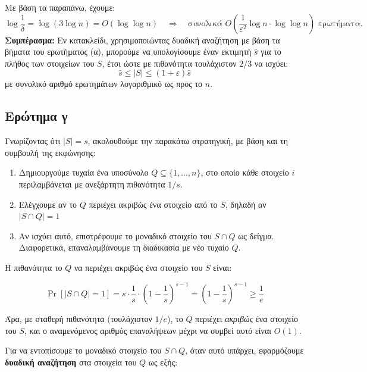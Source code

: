 \documentclass[12pt]{article}
\begin{document}
\vspace{0.5em}
Με βάση τα παραπάνω, έχουμε:
\[
\log \frac{1}{\delta} = \log(3 \log n) = O(\log \log n)
\quad \Rightarrow \quad
\text{συνολικά } O\left( \frac{1}{\varepsilon^2} \log n \cdot \log \log n \right) \text{ ερωτήματα.}
\]
\vspace{0.5em}
\noindent
\textbf{Συμπέρασμα:} Εν κατακλείδι, χρησιμοποιώντας δυαδική αναζήτηση με βάση τα βήματα του ερωτήματος (α), μπορούμε να υπολογίσουμε έναν εκτιμητή $\hat{s}$ για το πλήθος των στοιχείων του $S$, έτσι ώστε με πιθανότητα τουλάχιστον $2/3$ να ισχύει:
\[
\hat{s} \leq |S| \leq (1 + \varepsilon)\hat{s}
\]
με συνολικό αριθμό ερωτημάτων λογαριθμικό ως προς το $n$.


\subsection*{Ερώτημα γ}

Γνωρίζοντας ότι $|S| = s$, ακολουθούμε την παρακάτω στρατηγική, με βάση και τη συμβουλή της εκφώνησης:

\begin{enumerate}
    \item Δημιουργούμε τυχαία ένα υποσύνολο $Q \subseteq \{1, \dots, n\}$, στο οποίο κάθε στοιχείο $i$ περιλαμβάνεται με ανεξάρτητη πιθανότητα $1/s$.
    
    \item Ελέγχουμε αν το $Q$ περιέχει ακριβώς ένα στοιχείο από το $S$, δηλαδή αν $|S \cap Q| = 1$

    \item Αν ισχύει αυτό, επιστρέφουμε το μοναδικό στοιχείο του $S \cap Q$ ως δείγμα. Διαφορετικά, επαναλαμβάνουμε τη διαδικασία με νέο τυχαίο $Q$.
\end{enumerate}

\vspace{0.5em}
Η πιθανότητα το $Q$ να περιέχει ακριβώς ένα στοιχείο του $S$ είναι:

\[
\Pr[|S \cap Q| = 1] = s \cdot \frac{1}{s} \cdot \left(1 - \frac{1}{s} \right)^{s-1} = \left(1 - \frac{1}{s} \right)^{s-1} \geq \frac{1}{e}
\]

Άρα, με σταθερή πιθανότητα (τουλάχιστον $1/e$), το $Q$ περιέχει \emph{ακριβώς} ένα στοιχείο του $S$, και ο αναμενόμενος αριθμός επαναλήψεων μέχρι να συμβεί αυτό είναι $O(1)$.

\vspace{0.5em}
Για να εντοπίσουμε το μοναδικό στοιχείο του $S \cap Q$, όταν αυτό υπάρχει, εφαρμόζουμε \textbf{δυαδική αναζήτηση} στα στοιχεία του $Q$ ως εξής:
\end{document}
